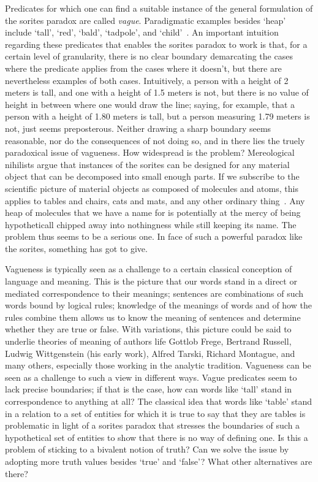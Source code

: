 \documentclass[a4paper]{article}
\begin{document}
Predicates for which one can find a suitable instance of the general formulation of the sorites paradox are called \emph{vague}.
Paradigmatic examples besides `heap' include `tall', `red', `bald', `tadpole', and `child'~\parencite{Keefe1997}.
An important intuition regarding these predicates that enables the sorites paradox to work is that, for a certain level of granularity, there is no clear boundary demarcating the cases where the predicate applies from the cases where it doesn't, but there are nevertheless examples of both cases.
Intuitively, a person with a height of 2 meters is tall, and one with a height of 1.5 meters is not, but there is no value of height in between where one would draw the line; saying, for example, that a person with a height of 1.80 meters is tall, but a person measuring 1.79 meters is not, just seems preposterous.
Neither drawing a sharp boundary seems reasonable, nor do the consequences of not doing so, and in there lies the truely paradoxical issue of vagueness.
How widespread is the problem?
Mereological nihilists argue that instances of the sorites can be designed for any material object that can be decomposed into small enough parts.
If we subscribe to the scientific picture of material objects as composed of molecules and atoms, this applies to tables and chairs, cats and mats, and any other ordinary thing~\parencite{Unger1979}.
Any heap of molecules that we have a name for is potentially at the mercy of being hypotheticall chipped away into nothingness while still keeping its name.
The problem thus seems to be a serious one.
In face of such a powerful paradox like the sorites, something has got to give.

Vagueness is typically seen as a challenge to a certain classical conception of language and meaning.
This is the picture that our words stand in a direct or mediated correspondence to their meanings; sentences are combinations of such words bound by logical rules; knowledge of the meanings of words and of how the rules combine them allows us to know the meaning of sentences and determine whether they are true or false.
With variations, this picture could be said to underlie theories of meaning of authors life Gottlob Frege, Bertrand Russell, Ludwig Wittgenstein (his early work), Alfred Tarski, Richard Montague, and many others, especially those working in the analytic tradition.
Vagueness can be seen as a challenge to such a view in different ways.
Vague predicates seem to lack precise boundaries; if that is the case, how can words like `tall' stand in correspondence to anything at all?
The classical idea that words like `table' stand in a relation to a set of entities for which it is true to say that they are tables is problematic in light of a sorites paradox that stresses the boundaries of such a hypothetical set of entities to show that there is no way of defining one.
Is this a problem of sticking to a bivalent notion of truth?
Can we solve the issue by adopting more truth values besides `true' and `false'?
What other alternatives are there?
\end{document}
